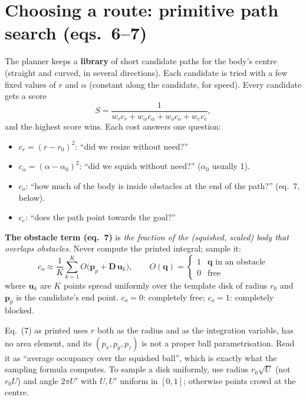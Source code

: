 \documentclass[11pt,a4paper]{article}
\newcommand{\vect}[1]{\mathbf{#1}}
\begin{document}
\section{Choosing a route: primitive path search (eqs.~6--7)}\label{sec:search}

The planner keeps a \textbf{library} of short candidate paths for the body's centre (straight and curved, in several
directions). Each candidate is tried with a few fixed values of $r$ and $\alpha$ (constant along the candidate, for
speed). Every candidate gets a score
\begin{equation}
S=\frac{1}{w_r c_r+w_\alpha c_\alpha+w_o c_o+w_e c_e},\tag{6}
\end{equation}
and the highest score wins. Each cost answers one question:
\begin{itemize}
\item $c_r=(r-r_0)^2$: ``did we resize without need?''
\item $c_\alpha=(\alpha-\alpha_0)^2$: ``did we squish without need?'' ($\alpha_0$ usually 1).
\item $c_o$: ``how much of the body is inside obstacles at the end of the path?'' (eq.~7, below).
\item $c_e$: ``does the path point towards the goal?''
\end{itemize}

\textbf{The obstacle term (eq.~7)} is \emph{the fraction of the (squished, scaled) body that overlaps obstacles}.
Never compute the printed integral; sample it:
\[
c_o\approx\frac1K\sum_{k=1}^K O\big(\vect{p}_p+\vect{D}\,\vect{u}_k\big),\qquad
O(\vect{q})=\begin{cases}1&\vect{q}\text{ in an obstacle}\\0&\text{free}\end{cases}
\]
where $\vect{u}_k$ are $K$ points spread uniformly over the template disk of radius $r_0$ and $\vect{p}_p$ is the
candidate's end point. $c_o=0$: completely free; $c_o=1$: completely blocked.

\begin{watchbox}
Eq.~(7) as printed uses $r$ both as the radius and as the integration variable, has no area element, and its
$(p_x,p_y,p_z)$ is not a proper ball parametrisation. Read it as ``average occupancy over the squished ball'', which
is exactly what the sampling formula computes. To sample a disk uniformly, use radius $r_0\sqrt{U}$ (not $r_0U$) and
angle $2\pi U'$ with $U,U'$ uniform in $[0,1]$; otherwise points crowd at the centre.
\end{watchbox}
\end{document}
